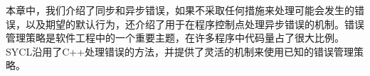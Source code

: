 本章中，我们介绍了同步和异步错误，如果不采取任何措施来处理可能会发生的错误，以及期望的默认行为，还介绍了用于在程序控制点处理异步错误的机制。错误管理策略是软件工程中的一个重要主题，在许多程序中代码量占了很大比例。SYCL沿用了C++处理错误的方法，并提供了灵活的机制来使用已知的错误管理策略。\par


\newpage